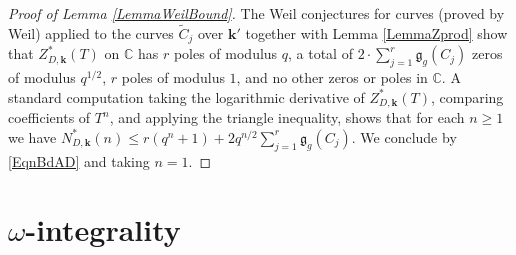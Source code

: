 \documentclass[11pt]{amsart}
\theoremstyle{remark}
\numberwithin{equation}{section}
\newcommand{\gfrak}{\mathfrak{g}}
\newcommand{\C}{\mathbb{C}}
\newcommand{\kk}{\mathbf{k}}
\begin{document}
\begin{proof}[Proof of Lemma \ref{LemmaWeilBound}] The Weil conjectures for curves (proved by Weil) applied to the curves $\widetilde{C}_j$ over $\kk'$ together with Lemma \ref{LemmaZprod} show that $Z^*_{D,\kk}(T)$ on $\C$ has $r$ poles of modulus $q$, a total of $2\cdot \sum_{j=1}^r \gfrak_g(C_j)$ zeros of modulus $q^{1/2}$, $r$ poles of modulus $1$, and no other zeros or poles in $\C$. A standard computation taking the logarithmic derivative of $Z^*_{D,\kk}(T)$, comparing coefficients of $T^n$, and applying the triangle inequality, shows that for each $n\ge 1$ we have $N^*_{D,\kk}(n)\le r(q^n+1) + 2q^{n/2} \sum_{j=1}^r \gfrak_g(C_j)$. We conclude by \eqref{EqnBdAD} and taking $n=1$. 
\end{proof}








\section{$\omega$-integrality} \label{Secwint}


\end{document}
